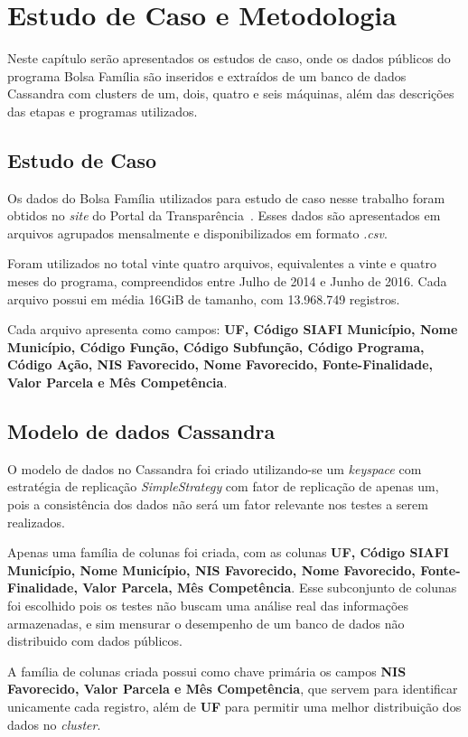 

\chapter{Estudo de Caso e Metodologia}

Neste capítulo serão apresentados os estudos de caso, onde os dados públicos do programa Bolsa Família são inseridos e extraídos de um banco de dados Cassandra com clusters de um, dois, quatro e seis máquinas, além das descrições das etapas e programas utilizados.

\section{Estudo de Caso}
Os dados do Bolsa Família utilizados para estudo de caso nesse trabalho foram obtidos no \emph{site} do Portal da Transparência~\cite{portaldatransparencia}. Esses dados são apresentados em arquivos agrupados mensalmente e disponibilizados em formato \emph{.csv}. 

Foram utilizados no total vinte quatro arquivos, equivalentes a vinte e quatro meses do programa, compreendidos entre Julho de 2014 e Junho de 2016. Cada arquivo possui em média 16GiB de tamanho, com 13.968.749 registros.

Cada arquivo apresenta como campos: \textbf{UF, Código SIAFI Município, Nome Município, Código Função, Código Subfunção, Código Programa, Código Ação, NIS Favorecido, Nome Favorecido, Fonte-Finalidade, Valor Parcela e Mês Competência}. 


\section{Modelo de dados Cassandra}
O modelo de dados no Cassandra foi criado utilizando-se um \emph{keyspace} com estratégia de replicação \emph{SimpleStrategy} com fator de replicação de apenas um, pois a consistência dos dados não será um fator relevante nos testes a serem realizados.

Apenas uma família de colunas foi criada, com as colunas \textbf{UF, Código SIAFI Município, Nome Município, NIS Favorecido, Nome Favorecido, Fonte-Finalidade, Valor Parcela, Mês Competência}. Esse subconjunto de colunas foi escolhido pois os testes não buscam uma análise real das informações armazenadas, e sim mensurar o desempenho de um banco de dados não distribuido com dados públicos.

A família de colunas criada possui como chave primária os campos \textbf{NIS Favorecido, Valor Parcela e Mês Competência}, que servem para identificar unicamente cada registro, além de \textbf{UF} para permitir uma melhor distribuição dos dados no \emph{cluster}.

